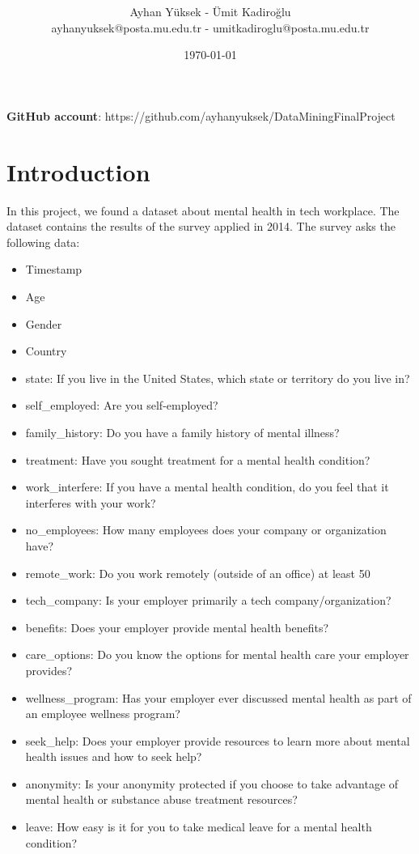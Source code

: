 \documentclass[onecolumn]{article}
\title{\spacecaps{Data Mining Final Project: Predicting Mental Health Illnesses In Tech Workplace}\\ \normalsize \spacesc{CENG 3521, Data Mining} }
\author{Ayhan Yüksek - Ümit Kadiroğlu\\ayhanyuksek@posta.mu.edu.tr - umitkadiroglu@posta.mu.edu.tr}
\date{\today}
\begin{document}
\maketitle
\textbf{GitHub account}: https://github.com/ayhanyuksek/DataMiningFinalProject


\section{Introduction}
In this project, we found a dataset about mental health in tech workplace. The dataset contains the results of the survey applied in 2014. The survey asks the following data:
\begin{itemize}
\item Timestamp
\item Age
\item Gender
\item Country
\item state: If you live in the United States, which state or territory do you live in?
\item self\_employed: Are you self-employed?
\item family\_history: Do you have a family history of mental illness?
\item treatment: Have you sought treatment for a mental health condition?
\item work\_interfere: If you have a mental health condition, do you feel that it interferes with your work?
\item no\_employees: How many employees does your company or organization have?
\item remote\_work: Do you work remotely (outside of an office) at least 50%
\item tech\_company: Is your employer primarily a tech company/organization?
\item benefits: Does your employer provide mental health benefits?
\item care\_options: Do you know the options for mental health care your employer provides?
\item wellness\_program: Has your employer ever discussed mental health as part of an employee wellness program?
\item seek\_help: Does your employer provide resources to learn more about mental health issues and how to seek help?
\item anonymity: Is your anonymity protected if you choose to take advantage of mental health or substance abuse treatment resources?
\item leave: How easy is it for you to take medical leave for a mental health condition?

\end{itemize}
\end{document}
